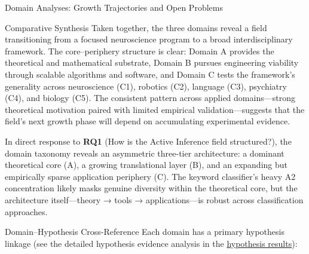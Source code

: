 \documentclass[
  ignorenonframetext,
]{beamer}
\begin{document}
\begin{frame}[allowframebreaks]{Domain Analyses: Growth Trajectories and
Open Problems \label{sec:subfield_analyses}}
\begin{block}{Comparative Synthesis}
\protect{}\label{comparative-synthesis}
Taken together, the three domains reveal a field transitioning from a
focused neuroscience program to a broad interdisciplinary framework. The
core--periphery structure is clear: Domain A provides the theoretical
and mathematical substrate, Domain B pursues engineering viability
through scalable algorithms and software, and Domain C tests the
framework's generality across neuroscience (C1), robotics (C2), language
(C3), psychiatry (C4), and biology (C5). The consistent pattern across
applied domains---strong theoretical motivation paired with limited
empirical validation---suggests that the field's next growth phase will
depend on accumulating experimental evidence.

In direct response to \textbf{RQ1} (How is the Active Inference field
structured?), the domain taxonomy reveals an asymmetric three-tier
architecture: a dominant theoretical core (A), a growing translational
layer (B), and an expanding but empirically sparse application periphery
(C). The keyword classifier's heavy A2 concentration likely masks
genuine diversity within the theoretical core, but the architecture
itself---theory → tools → applications---is robust across classification
approaches.

\begin{block}{Domain--Hypothesis Cross-Reference}
\protect{}\label{domainhypothesis-cross-reference}
Each domain has a primary hypothesis linkage (see the detailed
hypothesis evidence analysis in the
\hyperref[sec:hypothesis_results]{hypothesis results}):


\end{block}
\end{block}
\end{frame}
\end{document}
